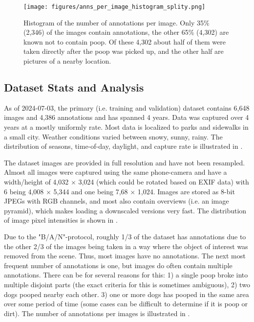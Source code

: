 \documentclass[10pt,twocolumn,letterpaper]{article}
\begin{document}
\begin{figure}[ht]
\centering
\texttt{[image: figures/anns\_per\_image\_histogram\_splity.png]}
\caption[]{
    Histogram of the number of annotations per image. 
    Only 35\% (2,346) of the images contain annotations, the other 65\% (4,302)
    are known not to contain poop. Of these 4,302 about half of them were taken
    directly after the poop was picked up, and the other half are pictures of a
    nearby location.
}
\label{fig:AnnotsPerImage}
\end{figure}


\subsection{Dataset Stats and Analysis}

As of 2024-07-03, the primary (i.e. training and validation) dataset contains
6,648 images and 4,386 annotations and has spanned 4 years. Data was captured
over 4 years at a mostly uniformly rate.  Most data is localized to parks and
sidewalks in a small city.  Weather conditions varied between snowy, sunny,
rainy.  The distribution of seasons, time-of-day, daylight, and capture rate is
illustrated in .

The dataset images are provided in full resolution and have not been resampled.
Almost all images were captured using the same phone-camera and have a
width/height of 4,032 $\times$ 3,024 (which could be rotated based on EXIF data) with 6
being 4,008  $\times$ 5,344 and one being 7,68 $\times$ 1,024. Images are stored as 8-bit JPEGs
with RGB channels, and most also contain overviews (i.e.  an image pyramid),
which makes loading a downscaled versions very fast.  The distribution of image
pixel intensities is shown in .


Due to the "B/A/N"-protocol, roughly 1/3 of the dataset has annotations due to
the other 2/3 of the images being taken in a way where the object of interest
was removed from the scene. Thus, most images have no annotations. The next
most frequent number of annotations is one, but images do often contain
multiple annotations.
There can be for several reasons for this:
    1) a single poop broke into multiple disjoint parts (the exact criteria for this is sometimes ambiguous), 
    2) two dogs pooped nearby each other. 
    3) one or more dogs has pooped in the same area over some period of
       time (some cases can be difficult to determine if it is poop or dirt).
The number of annotations per images is illustrated in
.
\end{document}
